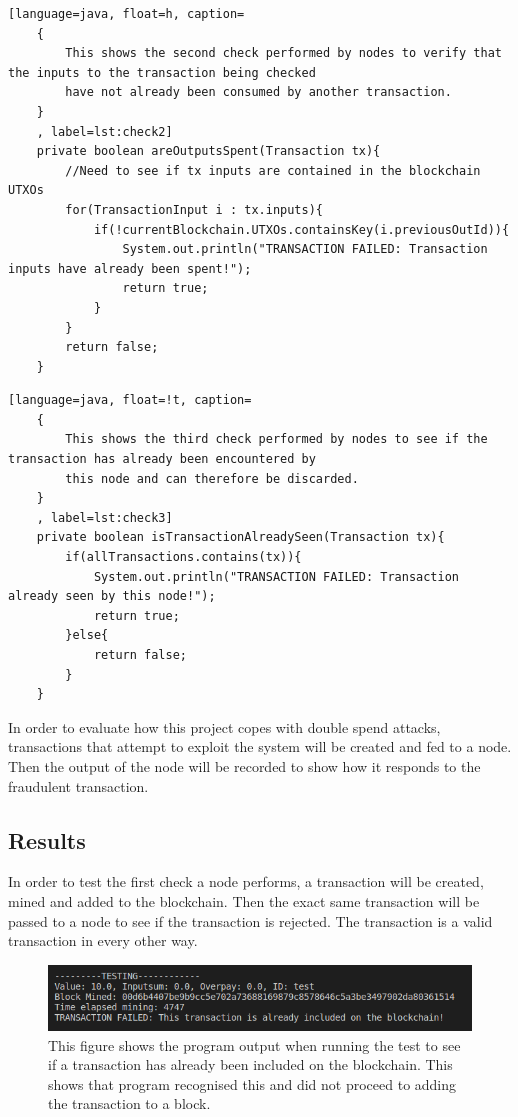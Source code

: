 \documentclass{l4proj}
\begin{document}
\begin{lstlisting}[language=java, float=h, caption=
    {
        This shows the second check performed by nodes to verify that the inputs to the transaction being checked
        have not already been consumed by another transaction.
    }
    , label=lst:check2]
    private boolean areOutputsSpent(Transaction tx){
        //Need to see if tx inputs are contained in the blockchain UTXOs
        for(TransactionInput i : tx.inputs){
            if(!currentBlockchain.UTXOs.containsKey(i.previousOutId)){
                System.out.println("TRANSACTION FAILED: Transaction inputs have already been spent!");
                return true;
            }
        }
        return false;
    }
\end{lstlisting}

\begin{lstlisting}[language=java, float=!t, caption=
    {
        This shows the third check performed by nodes to see if the transaction has already been encountered by
        this node and can therefore be discarded.
    }
    , label=lst:check3]
    private boolean isTransactionAlreadySeen(Transaction tx){
        if(allTransactions.contains(tx)){
            System.out.println("TRANSACTION FAILED: Transaction already seen by this node!");
            return true;
        }else{
            return false;
        }
    }
\end{lstlisting}

In order to evaluate how this project copes with double spend attacks, transactions that attempt to exploit the system
will be created and fed to a node. Then the output of the node will be recorded to show how it responds to the fraudulent
transaction.

\subsection{Results}
In order to test the first check a node performs, a transaction will be created, mined and added to the blockchain.
Then the exact same transaction will be passed to a node to see if the transaction is rejected. The transaction is
a valid transaction in every other way.

\begin{figure}[!ht]
    \centering
    \includegraphics[width=1\linewidth]{images/check1.png}    
    \caption
    {
        This figure shows the program output when running the test to see if a transaction has already been included
        on the blockchain. This shows that program recognised this and did not proceed to adding the transaction to a 
        block.
    }
    \label{fig:check1} 
\end{figure}
\end{document}
